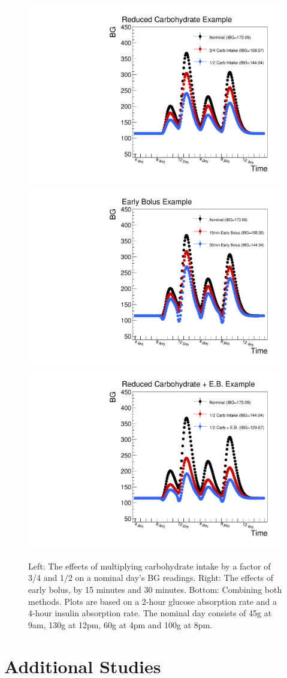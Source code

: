 \begin{figure}[htbp]
\begin{center}
\includegraphics[width=3.in]{figures/reduced_carb.pdf}
\includegraphics[width=3.in]{figures/early_bolus.pdf}
\includegraphics[width=3.in]{figures/reduced_carb_eb.pdf}
\caption{Left: The effects of multiplying carbohydrate intake by a factor of 3/4 and 1/2 on a nominal day's BG readings. 
Right: The effects of early bolus, by 15 minutes and 30 minutes. Bottom: Combining both methods. 
Plots are based on a 2-hour glucose absorption rate and a 4-hour insulin absorption rate.
The nominal day consists of 45g at 9am, 130g at 12pm, 60g at 4pm and 100g at 8pm. }
\label{fig:reduceCarb_eb}
\end{center}
\end{figure}


\section{Additional Studies}


